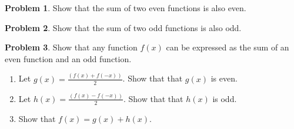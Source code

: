 \documentclass[11pt]{article} %
\theoremstyle{plain}%
\theoremstyle{definition}
\newtheorem{prob}{Problem}
\begin{document}
\begin{prob}
Show that the sum of two even functions is also even.
\end{prob}




\begin{prob}
Show that the sum of two odd functions is also odd.
\end{prob}



\begin{prob}
Show that any function $f(x)$ can be expressed as the sum of an even function and an odd function.

\begin{enumerate}[leftmargin=.5cm,itemindent=.5cm,labelwidth=\itemindent,labelsep=0cm,align=left,label=\alph*),ref=\alph*]
	\item Let $g(x) = \frac{\left( f(x) + f(-x) \right)}{2} $. Show that that $g(x)$ is even.
	\item Let $h(x) = \frac{ \left(f(x) - f(-x)\right)}{2}$. Show that that $h(x)$ is odd.
	\item Show that $f(x) = g(x) + h(x)$.
\end{enumerate}

\end{prob}
\end{document}
